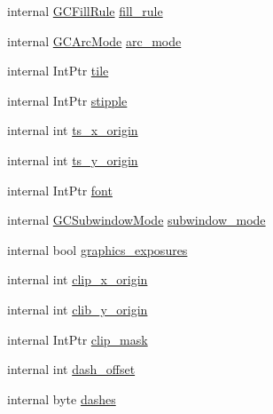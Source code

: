\begin{DoxyCompactItemize}
\item 
internal \hyperlink{namespace_tao_1_1_platform_1_1_x11_abcea9c46b6325fd2d26cd3f09467f982}{GCFillRule} \hyperlink{struct_tao_1_1_platform_1_1_x11_1_1_x_g_c_values_aebab3406c30fda91da3f5cb2b988c636}{fill\_\-rule}
\item 
internal \hyperlink{namespace_tao_1_1_platform_1_1_x11_a716dd8d8064367ad9135b71da3e4ea99}{GCArcMode} \hyperlink{struct_tao_1_1_platform_1_1_x11_1_1_x_g_c_values_a099190015d7f797ac8ca1460dcc7fe0f}{arc\_\-mode}
\item 
internal IntPtr \hyperlink{struct_tao_1_1_platform_1_1_x11_1_1_x_g_c_values_a4b61ded151b27b62953d10671ad48490}{tile}
\item 
internal IntPtr \hyperlink{struct_tao_1_1_platform_1_1_x11_1_1_x_g_c_values_a6882341ad32cacf1ae2b2f7e57256532}{stipple}
\item 
internal int \hyperlink{struct_tao_1_1_platform_1_1_x11_1_1_x_g_c_values_a0ebe2eb3f89d7683ff7a08aaba1f58ca}{ts\_\-x\_\-origin}
\item 
internal int \hyperlink{struct_tao_1_1_platform_1_1_x11_1_1_x_g_c_values_a6cfb5d14f9305644ec08a730251a03dd}{ts\_\-y\_\-origin}
\item 
internal IntPtr \hyperlink{struct_tao_1_1_platform_1_1_x11_1_1_x_g_c_values_a9a4f7f9ef8deaa0bd98ba8df0fe5f2b7}{font}
\item 
internal \hyperlink{namespace_tao_1_1_platform_1_1_x11_a5d4a69ed8a95ded601c3a197df0b0b25}{GCSubwindowMode} \hyperlink{struct_tao_1_1_platform_1_1_x11_1_1_x_g_c_values_a1498f904f9d13b408b3b804915183eb7}{subwindow\_\-mode}
\item 
internal bool \hyperlink{struct_tao_1_1_platform_1_1_x11_1_1_x_g_c_values_a6c5f3da2408aa92c50bff328696370f8}{graphics\_\-exposures}
\item 
internal int \hyperlink{struct_tao_1_1_platform_1_1_x11_1_1_x_g_c_values_a8a3e54ab816088cc7f915040dc98c8e4}{clip\_\-x\_\-origin}
\item 
internal int \hyperlink{struct_tao_1_1_platform_1_1_x11_1_1_x_g_c_values_a5d42724dc04fb1593c939c231b0d8991}{clib\_\-y\_\-origin}
\item 
internal IntPtr \hyperlink{struct_tao_1_1_platform_1_1_x11_1_1_x_g_c_values_aee5791b8981d8d8a061953643d33a214}{clip\_\-mask}
\item 
internal int \hyperlink{struct_tao_1_1_platform_1_1_x11_1_1_x_g_c_values_a4a39abbed6d9a476de8827c2fe4c7f2b}{dash\_\-offset}
\item 
internal byte \hyperlink{struct_tao_1_1_platform_1_1_x11_1_1_x_g_c_values_ab75df5159f56f34da6bbaadd4d5af533}{dashes}
\end{DoxyCompactItemize}


